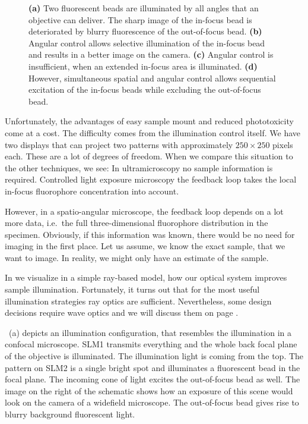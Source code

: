 \begin{figure}[!hbt]
  \centering
  \def\svgscale{.43}
  
  \caption{{\bf (a)} Two fluorescent beads are illuminated by all
    angles that an objective can deliver. The sharp image of the
    in-focus bead is deteriorated by blurry fluorescence of the
    out-of-focus bead. {\bf (b)} Angular control allows selective
    illumination of the in-focus bead and results in a better image on
    the camera. {\bf (c)} Angular control is insufficient, when an
    extended in-focus area is illuminated. {\bf (d)} However,
    simultaneous spatial and angular control allows sequential
    excitation of the in-focus beads while excluding the out-of-focus
    bead.}
  \label{fig:hourglass-all}
\end{figure}

Unfortunately, the advantages of easy sample mount and reduced
phototoxicity come at a cost. The difficulty comes from the
illumination control itself. We have two displays that can project two
patterns with approximately $250\times 250$ pixels each. These are a
lot of degrees of freedom.  When we compare this situation to the
other techniques, we see: In ultramicroscopy no sample information is
required. Controlled light exposure microscopy the feedback loop takes
the local in-focus fluorophore concentration into account.

However, in a spatio-angular microscope, the feedback loop depends on
a lot more data, i.e.\ the full three-dimensional fluorophore
distribution in the specimen. Obviously, if this information was
known, there would be no need for imaging in the first place. Let us
assume, we know the exact sample, that we want to image. In reality,
we might only have an estimate of the sample.

In  we visualize in a simple ray-based
model, how our optical system improves sample
illumination. Fortunately, it turns out that for the most useful
illumination strategies ray optics are sufficient. Nevertheless, some
design decisions require wave optics and we will discuss them on page
\pageref{sec:wave-constraints}.

~(a) depicts an illumination configuration,
that resembles the illumination in a confocal microscope. SLM1
transmits everything and the whole back focal plane of the objective
is illuminated. The illumination light is coming from the top.  The
pattern on SLM2 is a single bright spot and illuminates a fluorescent
bead in the focal plane. The incoming cone of light excites the
out-of-focus bead as well. The image on the right of the schematic
shows how an exposure of this scene would look on the camera of a
widefield microscope. The out-of-focus bead gives rise to blurry
background fluorescent light.

